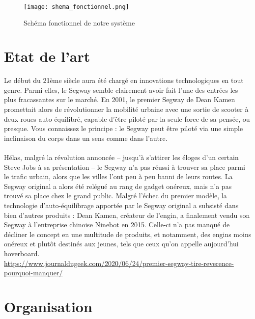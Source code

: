 \documentclass[oneside,a4paper,12pt]{article}
\begin{document}
	\begin{figure}[h]
		\centering
		\texttt{[image: shema\_fonctionnel.png]}
		\caption{Schéma fonctionnel de notre système}
	\end{figure}

	\section{Etat de l'art}
	\paragraph{}
	Le début du 21ème siècle aura été chargé en innovations technologiques en tout genre. Parmi elles, le Segway semble clairement avoir fait l’une des entrées les plus fracassantes sur le marché. En 2001, le premier Segway de Dean Kamen promettait alors de révolutionner la mobilité urbaine avec une sortie de scooter à deux roues auto équilibré, capable d’être piloté par la seule force de sa pensée, ou presque. Vous connaissez le principe : le Segway peut être piloté via une simple inclinaison du corps dans un sens comme dans l’autre.
	\paragraph{}
	Hélas, malgré la révolution annoncée – jusqu’à s’attirer les éloges d’un certain Steve Jobs à sa présentation – le Segway n’a pas réussi à trouver sa place parmi le trafic urbain, alors que les villes l’ont peu à peu banni de leurs routes. La Segway original a alors été relégué au rang de gadget onéreux, mais n’a pas trouvé sa place chez le grand public. Malgré l’échec du premier modèle, la technologie d’auto-équilibrage apportée par le Segway original a subsisté dans bien d’autres produits : Dean Kamen, créateur de l’engin, a finalement vendu son Segway à l’entreprise chinoise Ninebot en 2015. Celle-ci n’a pas manqué de décliner le concept en une multitude de produits, et notamment, des engins moins onéreux et plutôt destinés aux jeunes, tels que ceux qu’on appelle aujourd’hui hoverboard.\\
	
	\sloppy
	\url{https://www.journaldugeek.com/2020/06/24/premier-segway-tire-reverence-pourquoi-manquer/}
	
	\newpage
	
	\section{Organisation}
	
\end{document}
